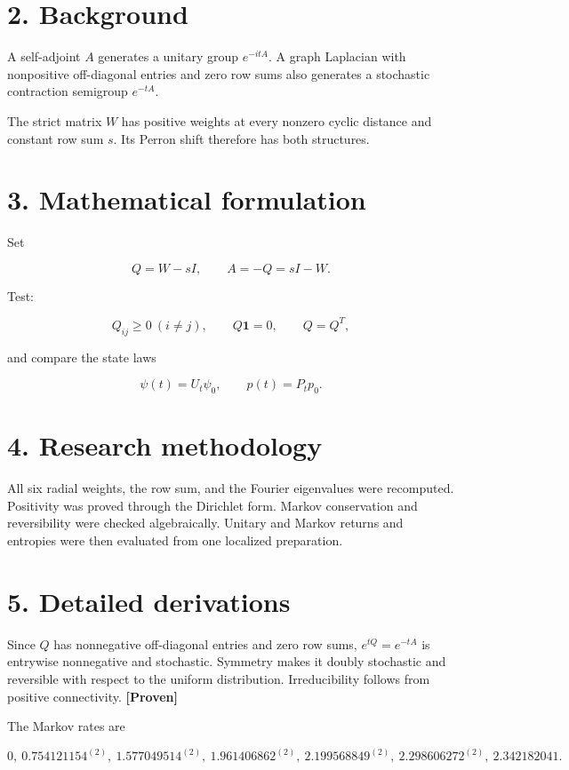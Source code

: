 \documentclass[11pt,a4paper,openany]{report}
\newcommand{\statusProven}{\textcolor{fingreen}{[Proven]}}
\begin{document}
\section{2. Background}

A self-adjoint \(A\) generates a unitary group \(e^{-itA}\). A graph Laplacian with nonpositive off-diagonal entries and zero row sums also generates a stochastic contraction semigroup \(e^{-tA}\).

The strict matrix \(W\) has positive weights at every nonzero cyclic distance and constant row sum \(s\). Its Perron shift therefore has both structures.

\section{3. Mathematical formulation}

Set

\[
Q=W-sI,\qquad A=-Q=sI-W.
\]

Test:

\[
Q_{ij}\ge0\ (i\ne j),\qquad Q\mathbf1=0,
\qquad Q=Q^T,
\]

and compare the state laws

\[
\psi(t)=U_t\psi_0,\qquad p(t)=P_tp_0.
\]

\section{4. Research methodology}

All six radial weights, the row sum, and the Fourier eigenvalues were recomputed. Positivity was proved through the Dirichlet form. Markov conservation and reversibility were checked algebraically. Unitary and Markov returns and entropies were then evaluated from one localized preparation.

\section{5. Detailed derivations}

Since \(Q\) has nonnegative off-diagonal entries and zero row sums, \(e^{tQ}=e^{-tA}\) is entrywise nonnegative and stochastic. Symmetry makes it doubly stochastic and reversible with respect to the uniform distribution. Irreducibility follows from positive connectivity. \textbf{\statusProven{}}

The Markov rates are

\[
0,\ 0.754121154^{(2)},\ 1.577049514^{(2)},\
1.961406862^{(2)},\ 2.199568849^{(2)},\
2.298606272^{(2)},\ 2.342182041.
\]
\end{document}

